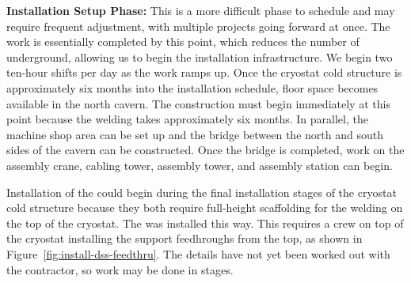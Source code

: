 
{\bf Installation Setup Phase:} %
    This is a more difficult phase to schedule and may require frequent adjustment, with multiple projects going forward at once. The  work is essentially completed by this point, which reduces the number of  underground, allowing us to begin the installation infrastructure. 
     We begin two ten-hour shifts per day as the work ramps up.  Once the  cryostat cold structure is approximately six months into the installation schedule, floor space becomes available in the north cavern. The \coldbox construction must begin immediately at this point because the welding takes approximately six months. In parallel, the machine shop area can be set up and the bridge between the north and south sides of the cavern can be constructed.  Once the bridge is completed, work on the assembly crane,  cabling tower,  assembly tower, and  assembly station can begin. 
    
Installation of the  could begin during the final installation stages of the cryostat cold structure because they both require full-height scaffolding for the welding on the top of the cryostat. The   was installed this way. This requires a crew on top of the cryostat installing the  support feedhroughs from the top, as shown in Figure~\ref{fig:install-dss-feedthru}.  The details have not yet been worked out with the contractor, so work may be done in stages. 

